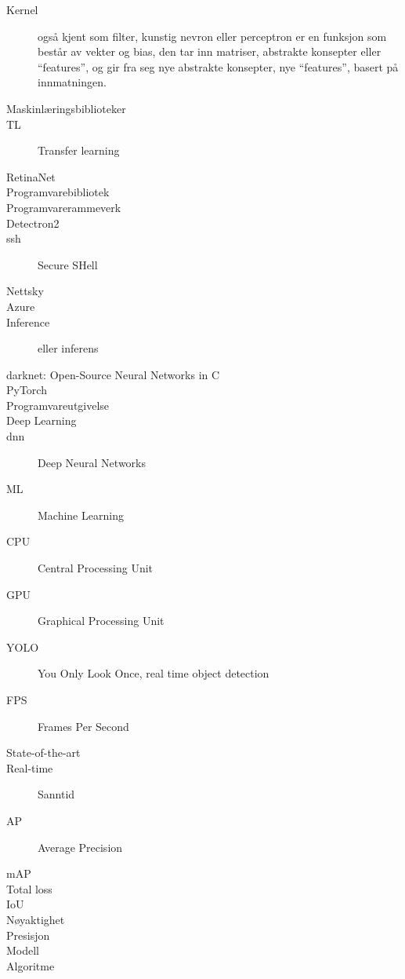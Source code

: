 \begin{description}
\item[Kernel] også kjent som filter, kunstig nevron eller perceptron er en funksjon som består av vekter og bias, den tar inn matriser, abstrakte konsepter eller ``features'', og gir fra seg nye abstrakte konsepter, nye ``features'', basert på innmatningen.
\item[Maskinlæringsbiblioteker]
\item[TL] Transfer learning
\item[RetinaNet]
\item[Programvarebibliotek]
\item[Programvarerammeverk]
\item[Detectron2]
\item[ssh] Secure SHell
\item[Nettsky]
\item[Azure]
\item[Inference] eller inferens 
\item[darknet: Open-Source Neural Networks in C]
\item[PyTorch]
\item[Programvareutgivelse]
\item[Deep Learning]
\item[dnn] Deep Neural Networks
\item[ML] Machine Learning
\item[CPU] Central Processing Unit
\item[GPU] Graphical Processing Unit
\item[YOLO] You Only Look Once, real time object detection
\item[FPS] Frames Per Second
\item[State-of-the-art] 
\item[Real-time] Sanntid
\item[AP] Average Precision
\item[mAP] 
\item[Total loss]
\item[IoU] 
\item[Nøyaktighet] 
\item[Presisjon] 
\item[Modell] 
\item[Algoritme]


\end{description}